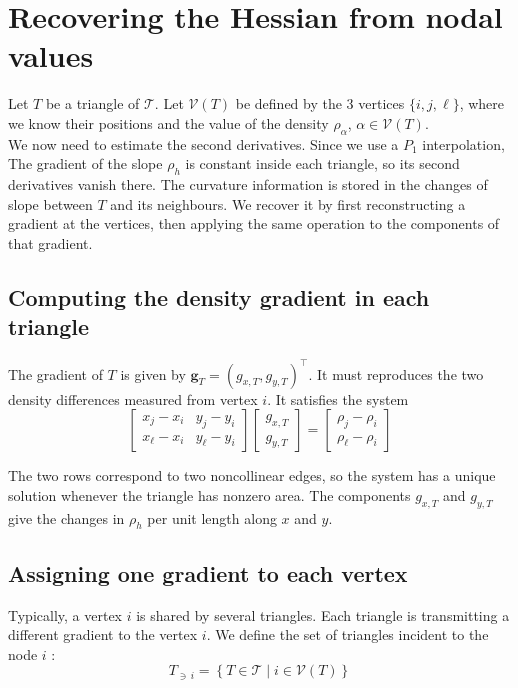 \documentclass[11pt,a4paper]{article}
\begin{document}
\section{Recovering the Hessian from nodal values}
Let $T$ be a triangle of $\mathcal{T}$. Let $\mathcal{V}(T)$ be defined by the 3 vertices $\{i,j,\ell\}$, where we know their positions and the value of the density $\rho_{\alpha}$, $\alpha \in \mathcal{V}(T)$. \\

\noindent
We now need to estimate the second derivatives. Since we use a $P_1$ interpolation, The gradient of the slope \(\rho_h\) is constant inside each triangle, so its second derivatives vanish there. The curvature information is stored in the changes of slope between $T$ and its neighbours. We recover it by first reconstructing a gradient at the vertices, then applying the same operation to the components of that gradient.

\subsection{Computing the density gradient in each triangle}

The gradient of $T$ is given by \(\mathbf g_T=(g_{x,T},g_{y,T})^\top\). It must reproduces
the two density differences measured from vertex \(i\). It satisfies
the system
\begin{equation}
  \begin{bmatrix}
    x_j-x_i & y_j-y_i\\
    x_\ell-x_i & y_\ell-y_i
  \end{bmatrix}
  \begin{bmatrix}g_{x,T}\\g_{y,T}\end{bmatrix}
  =
  \begin{bmatrix}\rho_j-\rho_i\\\rho_\ell-\rho_i\end{bmatrix}
\end{equation}

\noindent
The two rows correspond to two noncollinear edges, so the system has a unique solution whenever the triangle has nonzero area. The
components \(g_{x,T}\) and \(g_{y,T}\) give the changes in \(\rho_h\)
per unit length along \(x\) and \(y\).

\subsection{Assigning one gradient to each vertex}
\noindent
Typically, a vertex $i$ is shared by several triangles. Each triangle is transmitting a different gradient to the vertex $i$. We define the set of triangles incident to the node $i$ : 
\begin{equation}
    \boxed{
    T_{\ni \,i} = \left\{T\in \mathcal{T}\;|\;i\in \mathcal{V}(T)\right\}
    }
\end{equation}
\end{document}
